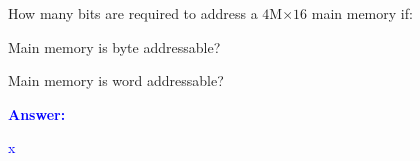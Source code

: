 \item{}
How many bits are required to address a $4$M$\times  16$ main memory if:
\begin{list}{\textbf{}}{}
    \item Main memory is byte addressable?\\[12pt]
    \item Main memory is word addressable?\\[12pt]
\end{list}
\vskip12pt
\ifanswers
\textcolor{blue}{
\textbf{Answer:}\\
\begin{list}{\textbf{}}{}
\item x
\end{list}
}
\newpage
\fi
